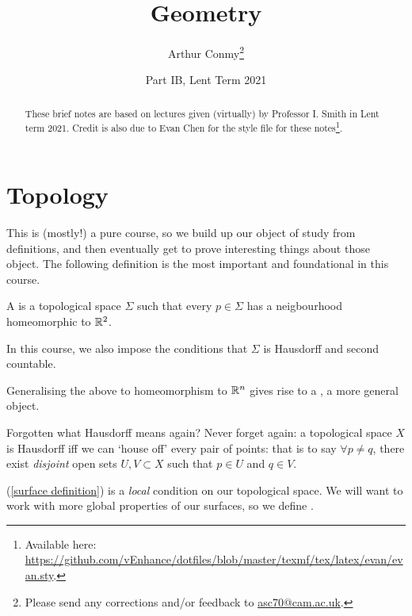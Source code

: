\documentclass[11pt]{scrartcl}
\begin{document}
\title{Geometry}
\author{Arthur Conmy\footnote{Please send any corrections and/or feedback to \url{asc70@cam.ac.uk}.}}
\date{Part IB, Lent Term 2021}

\maketitle
\begin{abstract}
These brief notes are based on lectures given (virtually) by Professor I. Smith in Lent term 2021. 
Credit is also due to Evan Chen for the style file for these notes\footnote{Available here: \url{https://github.com/vEnhance/dotfiles/blob/master/texmf/tex/latex/evan/evan.sty}.}.
\end{abstract}

\tableofcontents

\section{Topology}

This is (mostly!) a pure course, so we build up our object of study from definitions, and then eventually get to prove interesting things about those object. The following definition is the most important and foundational in this course.

\begin{definition}
[Surface]
\label{surface definition}
A  is a topological space $\Sigma$ such that every $p \in \Sigma$ has a neigbourhood homeomorphic to $\mathbb R^2$.

In this course, we also impose the conditions that $\Sigma$ is Hausdorff and second countable.
\end{definition}

\begin{remark}
Generalising the above to homeomorphism to $\mathbb R^n$ gives rise to a , a more general object.
\end{remark}

\begin{remark}
Forgotten what Hausdorff means again? Never forget again: a topological space $X$ is Hausdorff iff we can `house off' every pair of points: that is to say $\forall p \neq q$, there exist \textit{disjoint} open sets $U, V \subset X$ such that $p \in U$ and $q \in V$.
\end{remark}

(\ref{surface definition}) is a \textit{local} condition on our topological space. We will want to work with more global properties of our surfaces, so we define .
\end{document}
